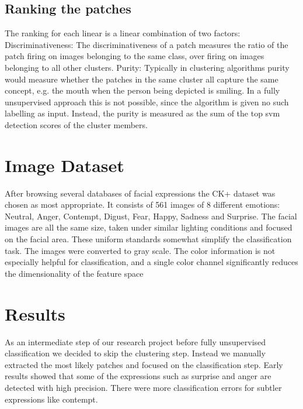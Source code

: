 \documentclass{article}
\begin{document}
\subsection{Ranking the patches}
The ranking for each linear is a linear combination of two factors: \newline 
Discriminativeness: The discriminativeness of a patch measures the ratio of the patch firing on images belonging to the same class, over firing on images belonging to all other clusters. \newline 
Purity: Typically in clustering algorithms purity would measure whether the patches in the same cluster all capture the same concept, e.g. the mouth when the person being depicted is smiling. In a fully unsupervised approach this is not possible, since the algorithm is given no such labelling as input. Instead, the purity is measured as the sum of the top svm detection scores of the cluster members.

\section{Image Dataset}
After browsing several databases of facial expressions the CK+ dataset \cite{ck} was chosen as most appropriate. It consists of 561 images of 8 different emotions: Neutral, Anger, Contempt, Digust, Fear, Happy, Sadness and Surprise. The facial images are all the same size, taken under similar lighting conditions and focused on the facial area.  These uniform standards somewhat simplify the classification task. The images were converted to gray scale. The color information is not especially helpful for classification, and a single color channel significantly reduces the dimensionality of the feature space 

\section{Results}
As an intermediate step of our research project before fully unsupervised classification we decided to skip the clustering step. Instead we manually extracted the most likely patches and focused on the classification step. Early results showed that some of the expressions such as surprise and anger are detected with high precision. There were more classification errors for subtler expressions like contempt.
\end{document}
